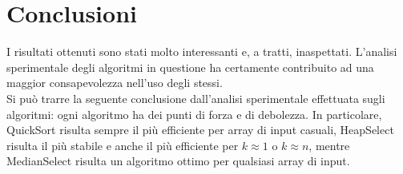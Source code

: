 \documentclass{article}
\begin{document}
	\section{Conclusioni}
	I risultati ottenuti sono stati molto interessanti e, a tratti, inaspettati. L'analisi sperimentale degli algoritmi in questione ha certamente contribuito ad una maggior consapevolezza nell'uso degli stessi.
	\\
	Si può trarre la seguente conclusione dall'analisi sperimentale effettuata sugli algoritmi: ogni algoritmo ha dei punti di forza e di debolezza. In particolare, QuickSort risulta sempre il più efficiente per array di input casuali, HeapSelect risulta il più stabile e anche il più efficiente per $k\approx 1 $ o $k \approx n$, mentre MedianSelect risulta un algoritmo ottimo per qualsiasi array di input.
	
\end{document}
